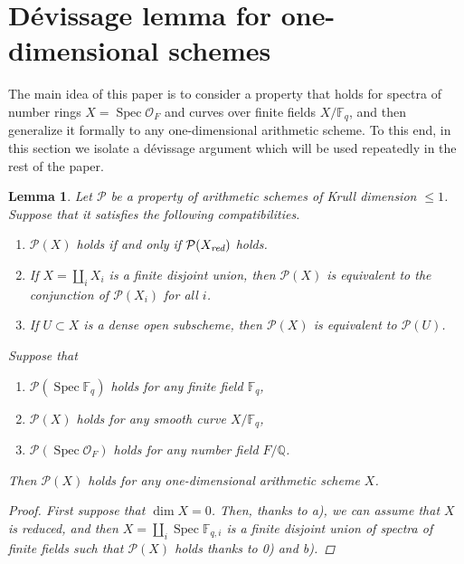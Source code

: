 \documentclass{article}
\DeclareMathOperator{\Spec}{Spec}
\newcommand{\FF}{\mathbb{F}}
\newcommand{\QQ}{\mathbb{Q}}
\newcommand{\red}{\text{\it red}}
\theoremstyle{myplain}
\newtheorem{lemma}[theorem]{Lemma}
\theoremstyle{mydefinition}
\begin{document}
\section{D\'{e}vissage lemma for one-dimensional schemes}
\label{sec:devissage}

The main idea of this paper is to consider a property that holds for spectra of
number rings $X = \Spec \mathcal{O}_F$ and curves over finite fields $X/\FF_q$,
and then generalize it formally to any one-dimensional arithmetic scheme.
To this end, in this section we isolate a d\'{e}vissage argument which will be
used repeatedly in the rest of the paper.

\begin{lemma}
  \label{lemma:devissage}
  Let $\mathcal{P}$ be a property of arithmetic schemes of Krull dimension
  $\le 1$. Suppose that it satisfies the following compatibilities.
  \begin{enumerate}
  \item[a)] $\mathcal{P} (X)$ holds if and only if $\mathcal{P} (X_\red)$ holds.

  \item[b)] If $X = \coprod_i X_i$ is a finite disjoint union, then
    $\mathcal{P} (X)$ is equivalent to the conjunction of $\mathcal{P} (X_i)$ for
    all $i$.

  \item[c)] If $U \subset X$ is a dense open subscheme, then $\mathcal{P} (X)$
    is equivalent to $\mathcal{P} (U)$.
  \end{enumerate}
  Suppose that
  \begin{enumerate}
  \item[0)] $\mathcal{P} (\Spec \FF_q)$ holds for any finite field $\FF_q$,

  \item[1)] $\mathcal{P} (X)$ holds for any smooth curve $X/\FF_q$,

  \item[2)] $\mathcal{P} (\Spec \mathcal{O}_F)$ holds for any number field
    $F/\QQ$.
  \end{enumerate}
  Then $\mathcal{P} (X)$ holds for any one-dimensional arithmetic scheme $X$.

  \begin{proof}
    First suppose that $\dim X = 0$. Then, thanks to a), we can assume that $X$
    is reduced, and then $X = \coprod_i \Spec \FF_{q,i}$ is a finite disjoint
    union of spectra of finite fields such that $\mathcal{P} (X)$ holds thanks
    to 0) and b).


\end{proof}
\end{lemma}
\end{document}
